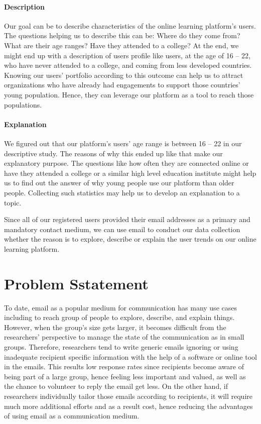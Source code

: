 \paragraph{Description}
Our goal can be to describe characteristics of the online learning platform's users. The questions helping us to describe this can be: Where do they come from? What are their age ranges? Have they attended to a college? At the end, we might end up with a description of users profile like users, at the age of 16 -- 22, who have never attended to a college, and coming from less developed countries. Knowing our users' portfolio according to this outcome can help us to attract organizations who have already had engagements to support those countries' young population. Hence, they can leverage our platform as a tool to reach those populations.

\paragraph{Explanation}
We figured out that our platform's users' age range is between 16 -- 22 in our descriptive study. The reasons of why this ended up like that make our explanatory purpose. The questions like how often they are connected online or have they attended a college or a similar high level education institute might help us to find out the answer of why young people use our platform than older people. Collecting such statistics may help us to develop an explanation to a topic.

\vspace{1cm}
Since all of our registered users provided their email addresses as a primary and mandatory contact medium, we can use email to conduct our data collection whether the reason is to explore, describe or explain the user trends on our online learning platform.

\section{Problem Sstatement}
\label{sec:2:Problem}

To date, email as a popular medium for communication has many use cases including to reach group of people to explore, describe, and explain things. However, when the group's size gets larger, it becomes difficult from the researchers' perspective to manage the state of the communication as in small groups. Therefore, researchers tend to write generic emails ignoring or using inadequate recipient specific information with the help of a software or online tool in the emails. This results low response rates since recipients become aware of being part of a large group, hence feeling less important and valued, as well as the chance to volunteer to reply the email get less. On the other hand, if researchers individually tailor those emails according to recipients, it will require much more additional efforts and as a result cost, hence reducing the advantages of using email as a communication medium.
\vspace{1cm}

